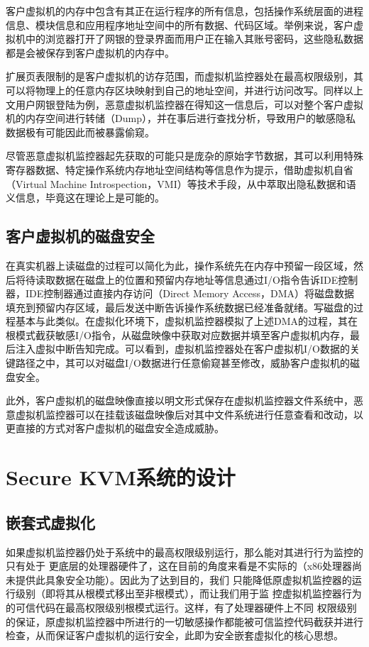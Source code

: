 客户虚拟机的内存中包含有其正在运行程序的所有信息，包括操作系统层面的进程信息、模块信息和应用程序地址空间中的所有数据、代码区域。举例来说，客户虚拟机中的浏览器打开了网银的登录界面而用户正在输入其账号密码，这些隐私数据都是会被保存到客户虚拟机的内存中。

扩展页表限制的是客户虚拟机的访存范围，而虚拟机监控器处在最高权限级别，其可以将物理上的任意内存区块映射到自己的地址空间，并进行访问改写。同样以上文用户网银登陆为例，恶意虚拟机监控器在得知这一信息后，可以对整个客户虚拟机的内存空间进行转储（Dump），并在事后进行查找分析，导致用户的敏感隐私数据极有可能因此而被暴露偷窥。

尽管恶意虚拟机监控器起先获取的可能只是庞杂的原始字节数据，其可以利用特殊寄存器数据、特定操作系统内存地址空间结构等信息作为提示，借助虚拟机自省（Virtual Machine Introspection，VMI）等技术手段，从中萃取出隐私数据和语义信息，毕竟这在理论上是可能的。

\subsection{客户虚拟机的磁盘安全}

在真实机器上读磁盘的过程可以简化为此，操作系统先在内存中预留一段区域，然后将待读取数据在磁盘上的位置和预留内存地址等信息通过I/O指令告诉IDE控制器，IDE控制器通过直接内存访问（Direct Memory Access，DMA）将磁盘数据填充到预留内存区域，最后发送中断告诉操作系统数据已经准备就绪。写磁盘的过程基本与此类似。在虚拟化环境下，虚拟机监控器模拟了上述DMA的过程，其在根模式截获敏感I/O指令，从磁盘映像中获取对应数据并填至客户虚拟机内存，最后注入虚拟中断告知完成。可以看到，虚拟机监控器处在客户虚拟机I/O数据的关键路径之中，其可以对磁盘I/O数据进行任意偷窥甚至修改，威胁客户虚拟机的磁盘安全。

此外，客户虚拟机的磁盘映像直接以明文形式保存在虚拟机监控器文件系统中，恶意虚拟机监控器可以在挂载该磁盘映像后对其中文件系统进行任意查看和改动，以更直接的方式对客户虚拟机的磁盘安全造成威胁。



\section{Secure KVM系统的设计}

\subsection{嵌套式虚拟化}

如果虚拟机监控器仍处于系统中的最高权限级别运行，那么能对其进行行为监控的只有处于
更底层的处理器硬件了，这在目前的角度来看是不实际的（x86处理器尚未提供此具象安全功能）。因此为了达到目的，我们
只能降低原虚拟机监控器的运行级别（即将其从根模式移出至非根模式），而让我们用于监
控虚拟机监控器行为的可信代码在最高权限级别根模式运行。这样，有了处理器硬件上不同
权限级别的保证，原虚拟机监控器中所进行的一切敏感操作都能被可信监控代码截获并进行
检查，从而保证客户虚拟机的运行安全，此即为安全嵌套虚拟化的核心思想。

